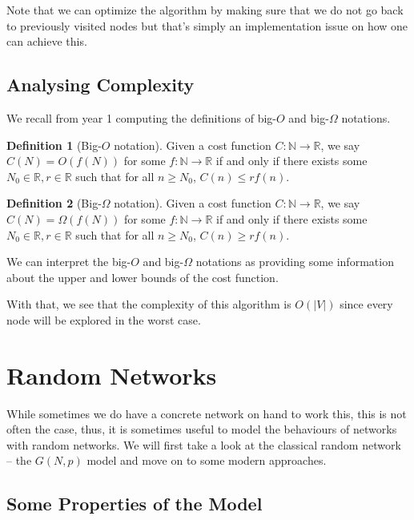 \documentclass[
]{article}
\theoremstyle{definition}
\newtheorem{definition}{Definition}[section]
\begin{document}
Note that we can optimize the algorithm by making sure that we do not go
back to previously visited nodes but that's simply an implementation
issue on how one can achieve this.

\hypertarget{analysing-complexity}{%
\subsection{Analysing Complexity}\label{analysing-complexity}}

We recall from year 1 computing the definitions of big-\(O\) and
big-\(\Omega\) notations.

\begin{definition}[Big-\(O\) notation]
  Given a cost function \(C : \mathbb{N} \to \mathbb{R}\), we say 
  \(C(N) = O(f(N))\) for some \(f : \mathbb{N} \to \mathbb{R}\) if and only 
  if there exists some \(N_0 \in \mathbb{R}, r \in \mathbb{R}\) such that 
  for all \(n \ge N_0\), \(C(n) \le rf(n)\).
\end{definition}

\begin{definition}[Big-\(\Omega\) notation]
  Given a cost function \(C : \mathbb{N} \to \mathbb{R}\), we say 
  \(C(N) = \Omega(f(N))\) for some \(f : \mathbb{N} \to \mathbb{R}\) if and only 
  if there exists some \(N_0 \in \mathbb{R}, r \in \mathbb{R}\) such that 
  for all \(n \ge N_0\), \(C(n) \ge rf(n)\).
\end{definition}

We can interpret the big-\(O\) and big-\(\Omega\) notations as providing
some information about the upper and lower bounds of the cost function.

With that, we see that the complexity of this algorithm is
\(O(\left|V\right|)\) since every node will be explored in the worst
case.

\hypertarget{random-networks}{%
\section{Random Networks}\label{random-networks}}

While sometimes we do have a concrete network on hand to work this, this
is not often the case, thus, it is sometimes useful to model the
behaviours of networks with random networks. We will first take a look
at the classical random network -- the \(G(N, p)\) model and move on to
some modern approaches.

\hypertarget{some-properties-of-the-model}{%
\subsection{Some Properties of the
Model}\label{some-properties-of-the-model}}
\end{document}
